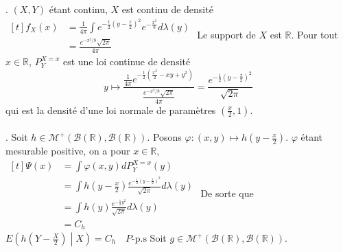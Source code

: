 \documentclass{report}
\begin{document}
\subsection{} \noindent{}\\ 
\\ 
\\
. $(X,Y)$ étant continu, $X$ est continu de densité $\begin{aligned}[t] 
f_X(x)&=\frac{1}{4\pi}\int e^{-\frac 12 (y-\frac{x}{2})^2}e^{-\frac{x^2}{8}} d\lambda(y)\\
&= \frac{e^{-x^2/8}\sqrt{2\pi}}{4\pi}
\end{aligned}$\newline
Le support de $X$ est $\mathbb R$.\newline
Pour tout $x\in \mathbb R$, $P_Y^{X=x}$ est une loi continue de densité $$\displaystyle y\mapsto \frac{\frac{1}{4\pi } e^{-\frac{1}{2}(\frac{x^2}{2}-xy+y^2)}}{\frac{e^{-x^2/8}\sqrt{2\pi}}{4\pi}} = \frac{e^{-\frac 12 (y-\frac{x}{2})^2}}{\sqrt {2\pi}}$$
qui est la densité d'une loi normale de paramètres $(\frac{x}{2},1)$.
\\ \\
. Soit $h\in \mathcal M^+(\mathcal B(\mathbb R),\mathcal B(\mathbb R))$. Posons $\varphi:(x,y)\mapsto h(y-\frac{x}{2})$. $\varphi$ étant mesurable positive, on a pour $x\in \mathbb R$, $\begin{aligned}[t]
\Psi(x) &= \int \varphi(x,y)dP_Y^{X=x}(y) \\
&= \int h(y-\frac{x}{2}) \frac{e^{-\frac 12 (y-\frac{x}{2})^2}}{\sqrt {2\pi}} d\lambda(y) \\
&= \int h(y) \frac{e^{-\frac 12 y^2}}{\sqrt {2\pi}} d\lambda(y)\\
&= C_h
\end{aligned}$\newline
De sorte que $E\left(h(Y-\frac{X}{2})\middle| X\right) = C_h \quad P\text{-p.s}$\newline
\newline
Soit $g\in \mathcal M^+(\mathcal B(\mathbb R),\mathcal B(\mathbb R))$.
\end{document}
